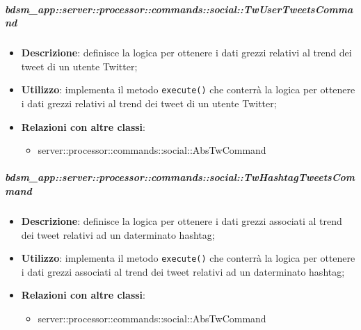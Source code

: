         \subparagraph{bdsm\_app::server::processor::commands::social::TwUserTweetsCommand} %
        \label{subp:bdsm_app_server_processor_commands_social_twcommand}
        \begin{itemize}
          \item \textbf{Descrizione}: definisce la logica per ottenere i dati grezzi relativi al trend dei tweet di un utente Twitter;
          \item \textbf{Utilizzo}: implementa il metodo \texttt{execute()} che conterrà la logica per ottenere i dati grezzi relativi al trend dei tweet di un utente Twitter;
          \item \textbf{Relazioni con altre classi}:
            \begin{itemize}
              \item server::processor::commands::social::AbsTwCommand
            \end{itemize}
        \end{itemize}

        \subparagraph{bdsm\_app::server::processor::commands::social::TwHashtagTweetsCommand} %
        \label{subp:bdsm_app_server_processor_commands_social_twhashtagtweetscommand}
        \begin{itemize}
          \item \textbf{Descrizione}: definisce la logica per ottenere i dati grezzi associati al trend dei tweet relativi ad un daterminato hashtag;
          \item \textbf{Utilizzo}: implementa il metodo \texttt{execute()} che conterrà la logica per ottenere i dati grezzi associati al trend dei tweet relativi ad un daterminato hashtag;
          \item \textbf{Relazioni con altre classi}:
            \begin{itemize}
              \item server::processor::commands::social::AbsTwCommand
            \end{itemize}
        \end{itemize}


